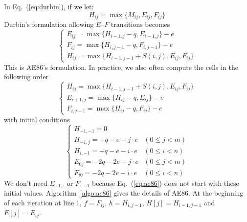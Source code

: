 \documentclass{bioinfo}
\begin{document}
In Eq.~(\ref{eq:durbin}), if we let:
\[H_{ij}=\max\{M_{ij},E_{ij},F_{ij}\}\]
Durbin's formulation allowing $E$--$F$ transitions becomes
\begin{equation*}
\left\{\begin{array}{l}
E_{ij}=\max\{H_{i-1,j}-q, E_{i-1,j}\} - e \\
F_{ij}=\max\{H_{i,j-1}-q, F_{i,j-1}\} - e \\
H_{ij}=\max\{H_{i-1,j-1}+S(i,j), E_{ij}, F_{ij}\}
\end{array}\right.
\end{equation*}
This is AE86's formulation. In practice, we also often compute the cells in the
following order
\begin{equation}\label{eq:ae86}
\left\{\begin{array}{l}
H_{ij}=\max\{H_{i-1,j-1}+S(i,j), E_{ij}, F_{ij}\}\\
E_{i+1,j}=\max\{H_{ij}-q, E_{ij}\} - e \\
F_{i,j+1}=\max\{H_{ij}-q, F_{ij}\} - e
\end{array}\right.
\end{equation}
with initial conditions
\begin{equation}
\left\{\begin{array}{ll}
H_{-1,-1}=0\\
H_{-1,j}=-q-e-j\cdot e & (0\le j<m)\\
H_{i,-1}=-q-e-i\cdot e & (0\le i<n)\\
E_{0j}=-2q-2e-j\cdot e & (0\le j<m)\\
F_{i0}=-2q-2e-i\cdot e & (0\le i<n)
\end{array}\right.
\end{equation}
We don't need $E_{-1,\cdot}$ or $F_{\cdot,-1}$ because Eq.~(\ref{eq:ae86})
does not start with these initial values. Algorithm~\ref{algo:ae86} gives
the details of AE86. At the beginning of each iteration at line 1, $f=F_{ij}$,
$h=H_{i,j-1}$, $H[j]=H_{i-1,j-1}$ and $E[j]=E_{ij}$.
\end{document}
